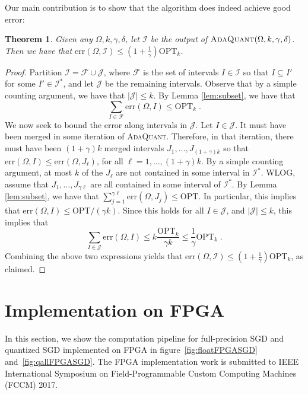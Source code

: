 \documentclass{article}
\newcommand{\err}{\ensuremath{\mathrm{err}}}
\newcommand{\setX}{\Omega}
\newcommand{\setI}{\mathcal{I}}
\newcommand{\OPT}{\ensuremath{\mathrm{OPT}}}
\newcommand{\setF}{\mathcal{F}}
\newcommand{\setJ}{\mathcal{J}}
\newtheorem{theorem}{Theorem}
\begin{document}
Our main contribution is to show that the algorithm does indeed achieve good error:
\begin{theorem}
Given any $\setX, k, \gamma, \delta$, let $\setI$ be the output of $\textsc{AdaQuant} (\setX, k, \gamma, \delta)$.
Then we have that $\err (\setX, \setI) \leq \left( 1 + \frac{1}{\gamma} \right) \OPT_k$.
\end{theorem}
\begin{proof}
Partition $\setI = \setF \cup \setJ$, where $\setF$ is the set of intervals $I \in \setI$ so that $I \subseteq I'$ for some $I' \in \setI^*$, and let $\setJ$ be the remaining intervals.
Observe that by a simple counting argument, we have that $|\setJ| \leq k$.
By Lemma \ref{lem:subset}, we have that 
\[
\sum_{I \in \setF} \err(\setX, I) \leq \OPT_k \; .
\]
We now seek to bound the error along intervals in $\setJ$.
Let $I \in \setJ$.
It must have been merged in some iteration of \textsc{AdaQuant}.
Therefore, in that iteration, there must have been $(1 + \gamma)k$ merged intervals $J_1, \ldots, J_{(1 + \gamma) k}$ so that $\err (\setX, I) \leq \err (\setX, J_\ell)$, for all $\ell = 1, \ldots, (1 + \gamma) k$.
By a simple counting argument, at most $k$ of the $J_\ell$ are not contained in some interval in $\setI^*$.
WLOG, assume that $J_1, \ldots, J_{\gamma \ell}$ are all contained in some interval of $\setI^*$.
By Lemma \ref{lem:subset}, we have that $\sum_{j = 1}^{\gamma \ell} \err (\setX, J_j) \leq \OPT$.
In particular, this implies that $\err (\setX, I) \leq \OPT / (\gamma k)$.
Since this holds for all $I \in \setJ$, and $|\setJ| \leq k$, this implies that 
\[
\sum_{I \in \setJ} \err (\setX, I) \leq k \frac{\OPT_k}{\gamma k} \leq \frac{1}{\gamma} \OPT_k \; .
\]
Combining the above two expressions yields that $\err (\setX, \setI) \leq  \left( 1 + \frac{1}{\gamma} \right) \OPT_k$, as claimed.
\end{proof}

\section{Implementation on FPGA}
\label{section:implementation}
In this section, we show the computation pipeline for full-precision SGD and quantized SGD implemented on FPGA in figure~\ref{fig:floatFPGASGD} and~\ref{fig:qallFPGASGD}. The FPGA implementation work is submitted to IEEE International Symposium on Field-Programmable Custom Computing Machines (FCCM) 2017.
\end{document}
